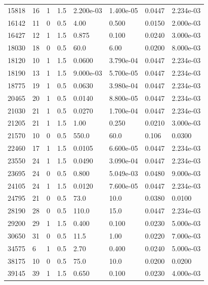 \documentclass[preview]{standalone}
\begin{document}
{{\begin{tabular}{L{1.2cm}C{1.2cm} C{0.3cm}C{0.5cm} C{1.4cm}C{1.4cm} C{1.4cm}C{1.4cm}}
  15818  &    16  & 1     & 1.5 &  2.200e-03  & 1.400e-05  & 0.0447 &  2.234e-03   \\ 
  16142  &    11  & 0     & 0.5 &  4.00  & 0.500  & 0.0150 &  2.000e-03   \\ 
  16427  &    12  & 1     & 1.5 &  0.875  & 0.100  & 0.0240 &  3.000e-03   \\ 
  18030  &    18  & 0     & 0.5 &  60.0  & 6.00  & 0.0200 &  8.000e-03   \\ 
  18120  &    10  & 1     & 1.5 &  0.0600  & 3.790e-04  & 0.0447 &  2.234e-03   \\ 
  18190  &    13  & 1     & 1.5 &  9.000e-03  & 5.700e-05  & 0.0447 &  2.234e-03   \\ 
  18775  &    19  & 1     & 0.5 &  0.0630  & 3.980e-04  & 0.0447 &  2.234e-03   \\ 
  20465  &    20  & 1     & 0.5 &  0.0140  & 8.800e-05  & 0.0447 &  2.234e-03   \\ 
  21030  &    21  & 1     & 0.5 &  0.0270  & 1.700e-04  & 0.0447 &  2.234e-03   \\ 
  21205  &    21  & 1     & 1.5 &  1.00  & 0.250  & 0.0210 &  3.000e-03   \\ 
  21570  &    10  & 0     & 0.5 &  550.0  & 60.0  & 0.106 &  0.0300   \\ 
  22460  &    17  & 1     & 1.5 &  0.0105  & 6.600e-05  & 0.0447 &  2.234e-03   \\ 
  23550  &    24  & 1     & 1.5 &  0.0490  & 3.090e-04  & 0.0447 &  2.234e-03   \\ 
  23695  &    24  & 0     & 0.5 &  0.800  & 5.049e-03  & 0.0480 &  9.000e-03   \\ 
  24105  &    24  & 1     & 1.5 &  0.0120  & 7.600e-05  & 0.0447 &  2.234e-03   \\ 
  24795  &    21  & 0     & 0.5 &  73.0  & 10.0  & 0.0380 &  0.0100   \\ 
  28190  &    28  & 0     & 0.5 &  110.0  & 15.0  & 0.0447 &  2.234e-03   \\ 
  29200  &    29  & 1     & 1.5 &  0.400  & 0.100  & 0.0230 &  5.000e-03   \\ 
  30650  &    31  & 0     & 0.5 &  11.5  & 1.00  & 0.0220 &  7.000e-03   \\ 
  34575  &     6  & 1     & 0.5 &  2.70  & 0.400  & 0.0240 &  5.000e-03   \\ 
  38175  &    10  & 0     & 0.5 &  75.0  & 10.0  & 0.0200 &  0.0200   \\ 
  39145  &    39  & 1     & 1.5 &  0.650  & 0.100  & 0.0230 &  4.000e-03   \\ 

\end{tabular}}}
\end{document}
